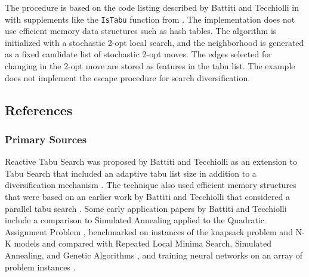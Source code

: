 The procedure is based on the code listing described by Battiti and Tecchiolli in \cite{Battiti1995a} with supplements like the \texttt{Is\-Tabu} function from \cite{Battiti1994}. The implementation does not use efficient memory data structures such as hash tables. The algorithm is initialized with a stochastic 2-opt local search, and the neighborhood is generated as a fixed candidate list of stochastic 2-opt moves. The edges selected for changing in the 2-opt move are stored as features in the tabu list. The example does not implement the escape procedure for search diversification. 



\subsection{References}

% 
% 
\subsubsection{Primary Sources}
Reactive Tabu Search was proposed by Battiti and Tecchiolli as an extension to Tabu Search that included an adaptive tabu list size in addition to a diversification mechanism \cite{Battiti1994}. The technique also used efficient memory structures that were based on an earlier work by Battiti and Tecchiolli that considered a parallel tabu search \cite{Battiti1992}.
Some early application papers by Battiti and Tecchiolli include a comparison to Simulated Annealing applied to the Quadratic Assignment Problem  \cite{Battiti1994a}, benchmarked on instances of the knapsack problem and N-K models and compared with Repeated Local Minima Search, Simulated Annealing, and Genetic Algorithms \cite{Battiti1995a}, and training neural networks on an array of problem instances \cite{Battiti1995b}.

